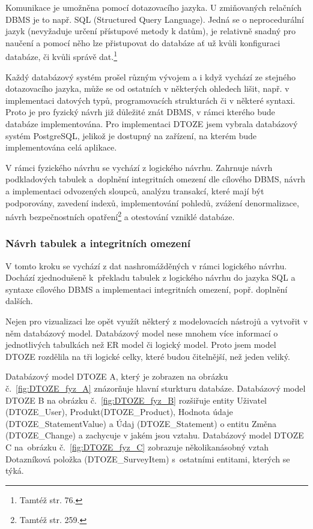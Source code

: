 \documentclass[11pt,a4paper]{article}
\begin{document}
Komunikace je umožněna pomocí dotazovacího jazyka. U zmiňovaných relačních DBMS je to např. SQL (Structured Query Language). Jedná se o neprocedurální jazyk (nevyžaduje určení přístupové metody k datům), je relativně snadný pro naučení a pomocí něho lze přistupovat do databáze ať už kvůli konfiguraci databáze, či kvůli správě dat.\footnote{Tamtéž str. 76.} 

Každý databázový systém prošel různým vývojem a i když vychází ze stejného dotazovacího jazyka, může se od ostatních v některých ohledech lišit, např. v implementaci datových typů, programovacích strukturách či v některé syntaxi. Proto je pro fyzický návrh již důležité znát DBMS, v rámci kterého bude databáze implementována. Pro implementaci DTOZE jsem vybrala databázový systém PostgreSQL, jelikož je dostupný na zařízení, na kterém bude implementována celá aplikace. 

V rámci fyzického návrhu se vychází z logického návrhu. Zahrnuje návrh podkladových tabulek a~doplnění integritních omezení dle cílového DBMS, návrh a implementaci odvozených sloupců, analýzu transakcí, které mají být podporovány, zavedení indexů, implementování pohledů, zvážení denormalizace, návrh bezpečnostních opatření\footnote{Tamtéž str. 259.} a otestování vzniklé databáze.             

\subsubsection{Návrh tabulek a integritních omezení}
V tomto kroku se vychází z dat nashromážděných v rámci logického návrhu. Dochází zjednodušeně k~překladu tabulek z logického návrhu do jazyka SQL a syntaxe cílového DBMS a implementaci integritních omezení, popř. doplnění dalších.

Nejen pro vizualizaci lze opět využít některý z modelovacích nástrojů a vytvořit v něm databázový model. Databázový model nese mnohem více informací o jednotlivých tabulkách než ER model či logický model. Proto jsem model DTOZE rozdělila na tři logické celky, které budou čitelnější, než jeden veliký.

Databázový model DTOZE A, který je zobrazen na obrázku č.~\ref{fig:DTOZE_fyz_A} znázorňuje hlavní sturkturu databáze. Databázový model DTOZE B na obrázku č.~\ref{fig:DTOZE_fyz_B} rozšiřuje entity Uživatel (DTOZE\_User), Produkt(DTOZE\_Product), Hodnota údaje (DTOZE\_StatementValue) a Údaj (DTOZE\_Statement) o entitu Změna (DTOZE\_Change) a zachycuje v jakém jsou vztahu. Databázový model DTOZE C na~obrázku č.~\ref{fig:DTOZE_fyz_C} zobrazuje několikanásobný vztah Dotazníková položka (DTOZE\_SurveyItem) s~ostatními entitami, kterých se týká. 
\end{document}
